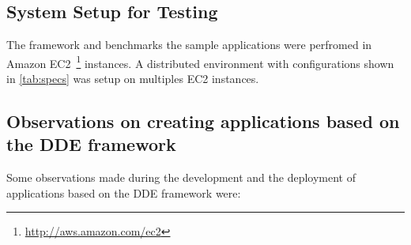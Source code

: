 \subsection{System Setup for Testing}
    The framework and benchmarks the sample applications were perfromed in Amazon EC2~\footnote{\url{http://aws.amazon.com/ec2}} instances. A distributed environment with configurations shown in \autoref{tab:specs} was setup on multiples EC2 instances.

\subsection{Observations on creating applications based on the DDE framework}
\label{subsec:result-framework}
   Some observations made during the development and the deployment of applications based on the DDE framework were:


